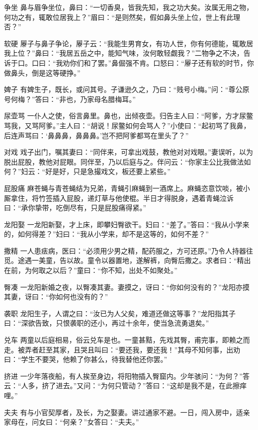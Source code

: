 \documentclass[12pt,UTF8]{ctexbook}
\begin{document}
争坐
鼻与眉争坐位，鼻曰：“一切香臭，皆我先知，我之功大矣。汝属无用之物，何功之有，辄敢位居我上？”眉曰：“是则然矣，假如鼻头坐上位，世上有此理否？”

软硬
屪子与鼻子争论，屪子云：“我能生男育女，有功人世，你有何德能，辄敢居我上位？”鼻曰：“我居五岳之中，能知气味，汝何敢轻觑我？”二物争之不决，告诉于口。口曰：“我劝你们和了罢。”鼻倔强不肯。口怒曰：“屪子还有软的时节，你做鼻头，倒是这等硬挣。”

婢子
有婢生子，既长，或问其号。子谦逊久之，乃曰：“贱号小梅。”问：“尊公原号何梅？”答曰：“非也，乃家母名腊梅耳。”

尿壶骂
一仆人之使，俗言鼻里。鼻也，出倾夜壶。归告主人曰：“阿爹，方才尿鳖骂我，又骂阿爹。”主人曰：“胡说！尿鳖如何会骂人？”小使曰：“起初骂了我鼻，后连声骂曰：‘鼻鼻鼻，鼻鼻鼻。’岂不把阿爹都骂在里头了？”

对戏
戏子出门，嘱其妻曰：“同伴来，可拿出戏鼓，教他对对戏眼。”妻误听，以为脱出屁股，教他对屁眼。同伴至，乃以后庭与之。伴问云：“你家主公比我做法如何？”妇云：“好是好，只是急撮戏文，板还要上紧些。”

屁股痛
麻苍蝇与青苍蝇结为兄弟，青蝇引麻蝇到一酒席上。麻蝇恣意饮啖，被小厮拿住，将竹签插入屁股，递灯草与他使棍。半日才得脱身，遇着青蝇泣诉曰：“承你挚带，吃倒尽有，只是屁股痛得紧。”

龙阳娶
一龙阳新娶，才上床，即攀妇臀欲干。妇曰：“差了。”答曰：“我从小学来的，如何得差？”妇曰：“我从小学来，却不是这等的，如何不差？”

撒精
一人患㾀病，医曰：“必须用少男之精，配药服之，方可还原。”乃令人持器往觅。途遇一美童，告以故。童令以器置地，遂解裤，向臀后撒之。求者曰：“精出在前，为何取之以后？”童曰：“你不知，出处不如聚处。”

臀凑
一龙阳新婚之夜，以臀凑其妻。妻摸之，讶曰：“你如何没有的？”龙阳亦摸其妻，讶曰：“你如何也没有的？”

袭职
龙阳生子，人谓之曰：“汝已为人父矣，难道还做这等事？”龙阳指其子曰：“深欲告致，只恨袭职的还小，再过十余年，使当急流勇退矣。”

兑车
两童以后庭相易，俗云兑车是也。一童甚黠，先戏其臀，甫完事，即赖之而走。被弄者赶至其家，且哭且叫曰：“要还我，要还我！”其母不知何事，出劝曰：“学生不要哭，他赖了你甚么，待我替他还你罢。”

挤进
一少年落夜船，有人挨至身边，将阳物插入臀窟内。少年骇问：“为何？”答云：“人多，挤了进去。”又问：“为何只管动？”答曰：“这却是我不是，在此擦痒哩。”

夫夫
有与小官契厚者，及长，为之娶妻。讲过通家不避。一日，闯入房中，适亲家母在，问女曰：“何亲？”女答曰：“夫夫。”
\end{document}
